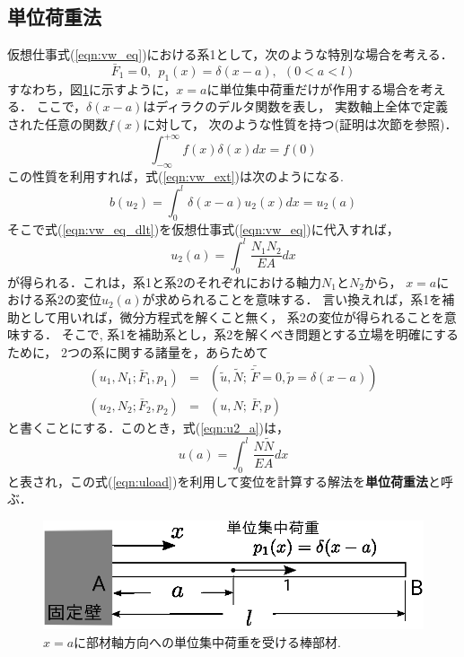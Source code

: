 \documentclass[10pt,a4j]{jarticle}
\begin{document}
\subsection{単位荷重法}
仮想仕事式(\ref{eqn:vw_eq})における系1として，次のような特別な場合を考える．
\begin{equation}
	\bar F_1=0, \ \ p_1(x)=\delta(x-a), \ \ (0<a<l)
	\label{eqn:sys1}
\end{equation}
すなわち，図\ref{fig:fig1_3}に示すように，$x=a$に単位集中荷重だけが作用する場合を考える．
ここで，$\delta(x-a)$はディラクのデルタ関数を表し，
実数軸上全体で定義された任意の関数$f(x)$に対して，
次のような性質を持つ(証明は次節を参照)．
\begin{equation}
	\int_{-\infty}^{+\infty} f(x) \delta(x)dx =f(0)
	\label{eqn:dlt_sampling}
\end{equation}
この性質を利用すれば，式(\ref{eqn:vw_ext})は次のようになる. 
\begin{equation}
	b(u_2)=\int_0^l \delta(x-a)u_2(x)dx= u_2(a)
	\label{eqn:vw_eq_dlt}
\end{equation}
そこで式(\ref{eqn:vw_eq_dlt})を仮想仕事式(\ref{eqn:vw_eq})に代入すれば，
\begin{equation}
	u_2(a)=\int_0^l \frac{N_1N_2}{EA}dx
	\label{eqn:u2_a}
\end{equation}
が得られる．これは，系1と系2のそれぞれにおける軸力$N_1$と$N_2$から，
$x=a$における系2の変位$u_2(a)$が求められることを意味する．
言い換えれば，系1を補助として用いれば，微分方程式を解くこと無く，
系2の変位が得られることを意味する．
そこで, 系1を補助系とし，系2を解くべき問題とする立場を明確にするために，
2つの系に関する諸量を，あらためて 
\begin{eqnarray}
	\left( u_1, N_1; \bar F_1, p_1 \right)& = &
		\left(\tilde u, \tilde N;\, \bar{\tilde{F}}=0, \tilde p= \delta(x-a) \right) 
	\label{eqn:aux}
	\\
	\left( u_2, N_2; \bar F_2, p_2 \right)& = &
		\left( u,  N;\, \bar F, p \right) 
	\label{eqn:prb}
\end{eqnarray}
と書くことにする．このとき，式(\ref{eqn:u2_a})は，
\begin{equation}
	u(a)=\int_0^l \frac{N \tilde N}{EA}dx
	\label{eqn:uload}
\end{equation}
と表され，この式(\ref{eqn:uload})を利用して変位を計算する解法を{\bf 単位荷重法}と呼ぶ．
\begin{figure}[h]
	\begin{center}
	\includegraphics[width=0.4\linewidth]{fig1_3.eps} 
	\end{center}
	\caption{$x=a$に部材軸方向への単位集中荷重を受ける棒部材.} 
	\label{fig:fig1_3}
\end{figure}
\end{document}
